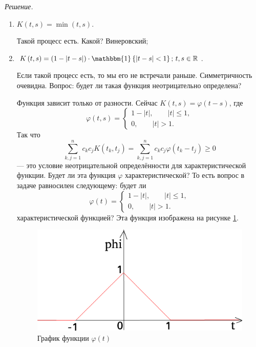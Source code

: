 \textit{Решение.}
\begin{enumerate}[label=\alph*)]
  \item $K \left( t, s \right) = \min \left( t, s \right) $.

  Такой процесс есть.
  Какой?
  Винеровский;
  \item $K \left( t, s \right) =
    \left( 1 - \left| t - s \right| \right) \cdot
    \mathbbm{1} \left\{ \left| t - s \right| < 1 \right\}; \,
    t, s \in \mathbb{R}$.

  Если такой процесс есть, то мы его не встречали раньше.
  Симметричность очевидна.
  Вопрос: будет ли такая функция неотрицательно определена?

  Функция зависит только от разности.
  Сейчас $K \left( t, s \right) = \varphi \left( t - s \right) $, где
  $$ \varphi \left( t, s \right) =
    \begin{cases}
      1 - \left| t \right| , \qquad \left| t \right| \leq 1, \\
      0, \qquad \left| t \right| > 1.
    \end{cases}$$
  Так что
  $$ \sum \limits_{k, j = 1}^n c_k c_j K \left( t_k, t_j \right) =
    \sum \limits_{k, j = 1}^n c_k c_j \varphi \left( t_k - t_j \right) \geq
    0$$
  --- это условие неотрицательной определённости для характеристической функции.
  Будет ли эта функция $ \varphi $ характеристической?
  То есть вопрос в задаче равносилен следующему: будет ли
  $$ \varphi \left( t \right) =
    \begin{cases}
      1 - \left| t \right| , \qquad \left| t \right| \leq 1, \\
      0, \qquad \left| t \right| > 1.
    \end{cases}$$
  характеристической функцией?
  Эта функция изображена на рисунке \ref{fig:42}.

  \begin{figure}[h!]
    \centering
    \includegraphics[width=.4\textwidth]{./pictures/4_2.png}
    \caption{График функции $ \varphi \left( t \right) $}
    \label{fig:42}
  \end{figure}



\end{enumerate}
